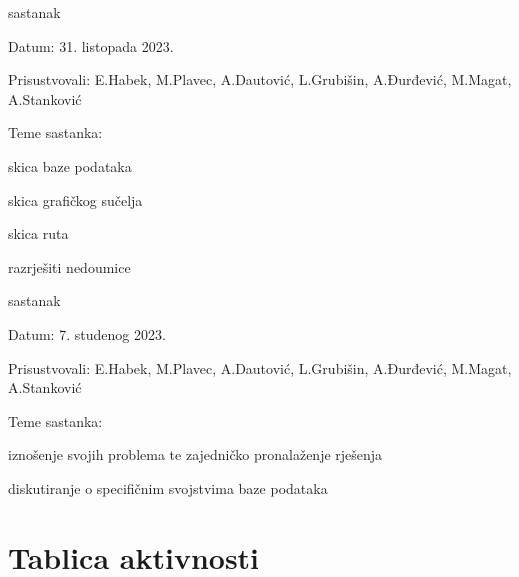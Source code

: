 \begin{packed_enum}
			\item  sastanak
			\item[] \begin{packed_item}
				\item Datum: 31. listopada 2023.
				\item Prisustvovali: E.Habek, M.Plavec, A.Dautović, L.Grubišin, A.Đurđević, M.Magat, A.Stanković
				\item Teme sastanka:
				\begin{packed_item}
					\item skica baze podataka
					\item skica grafičkog sučelja
					\item skica ruta
					\item razrješiti nedoumice
				\end{packed_item}
			\end{packed_item}

			\item  sastanak
			\item[] \begin{packed_item}
				\item Datum: 7. studenog 2023.
				\item Prisustvovali: E.Habek, M.Plavec, A.Dautović, L.Grubišin, A.Đurđević, M.Magat, A.Stanković
				\item Teme sastanka:
				\begin{packed_item}
					\item iznošenje svojih problema te zajedničko pronalaženje rješenja
					\item diskutiranje o specifičnim svojstvima baze podataka
				\end{packed_item}
			\end{packed_item}
			
		\end{packed_enum}
		
		\eject
		\section*{Tablica aktivnosti}
		
